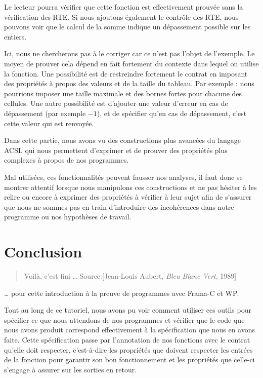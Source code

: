 \documentclass[12pt,francais,]{scrbook}
\begin{document}
Le lecteur pourra vérifier que cette fonction est effectivement prouvée
sans la vérification des RTE. Si nous ajoutons également le contrôle des
RTE, nous pouvons voir que le calcul de la somme indique un dépassement
possible sur les entiers.

Ici, nous ne chercherons pas à le corriger car ce n'est pas l'objet de
l'exemple. Le moyen de prouver cela dépend en fait fortement du contexte
dans lequel on utilise la fonction. Une possibilité est de restreindre
fortement le contrat en imposant des propriétés à propos des valeurs et
de la taille du tableau. Par exemple : nous pourrions imposer une taille
maximale et des bornes fortes pour chacune des cellules. Une autre
possibilité est d'ajouter une valeur d'erreur en cas de dépassement (par
exemple \(-1\)), et de spécifier qu'en cas de dépassement, c'est cette
valeur qui est renvoyée.

Dans cette partie, nous avons vu des constructions plus avancées du
langage ACSL qui nous permettent d'exprimer et de prouver des propriétés
plus complexes à propos de nos programmes.

Mal utilisées, ces fonctionnalités peuvent fausser nos analyses, il faut
donc se montrer attentif lorsque nous manipulons ces constructions et ne
pas hésiter à les relire ou encore à exprimer des propriétés à vérifier
à leur sujet afin de s'assurer que nous ne sommes pas en train
d'introduire des incohérences dans notre programme ou nos hypothèses de
travail.

\chapter{Conclusion}\label{conclusion}

\begin{quote}
Voilà, c'est fini \ldots{} Source:{[}Jean-Louis Aubert, \emph{Bleu Blanc
Vert}, 1989{]}
\end{quote}

\ldots{} pour cette introduction à la preuve de programmes avec Frama-C
et WP.

Tout au long de ce tutoriel, nous avons pu voir comment utiliser ces
outils pour spécifier ce que nous attendons de nos programmes et
vérifier que le code que nous avons produit correspond effectivement à
la spécification que nous en avons faite. Cette spécification passe par
l'annotation de nos fonctions avec le contrat qu'elle doit respecter,
c'est-à-dire les propriétés que doivent respecter les entrées de la
fonction pour garantir son bon fonctionnement et les propriétés que
celle-ci s'engage à assurer sur les sorties en retour.
\end{document}
